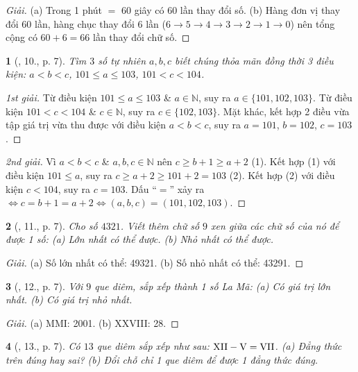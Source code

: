 \documentclass{article}
\newtheorem{baitoan}{}
\begin{document}
\begin{proof}[Giải]
	(a) Trong 1 phút $=$ 60 giây có 60 lần thay đổi số. (b) Hàng đơn vị thay đổi 60 lần, hàng chục thay đổi 6 lần ($6\to5\to4\to3\to2\to1\to0$) nên tổng cộng có $60 + 6 = 66$ lần thay đổi chữ số.
\end{proof}

\begin{baitoan}[\cite{Tuyen_Toan_6}, 10., p. 7]
	Tìm $3$ số tự nhiên $a,b,c$ biết chúng thỏa mãn đồng thời 3 điều kiện: $a < b < c$, $101\le a\le103$, $101 < c < 104$.
\end{baitoan}

\begin{proof}[1st giải]
	Từ điều kiện $101\le a\le103$ \& $a\in\mathbb{N}$, suy ra $a\in\{101,102,103\}$. Từ điều kiện $101 < c < 104$ \& $c\in\mathbb{N}$, suy ra $c\in\{102,103\}$. Mặt khác, kết hợp 2 điều vừa tập giá trị vừa thu được với điều kiện $a < b < c$, suy ra $a = 101$, $b = 102$, $c = 103$.
\end{proof}

\begin{proof}[2nd giải]
	Vì $a < b < c$ \& $a,b,c\in\mathbb{N}$ nên $c\ge b + 1\ge a + 2$ (1). Kết hợp (1) với điều kiện $101\le a$, suy ra $c\ge a + 2\ge101 + 2 = 103$ (2). Kết hợp (2) với điều kiện $c < 104$, suy ra $c = 103$. Dấu ``$=$'' xảy ra $\Leftrightarrow c = b + 1 = a + 2\Leftrightarrow(a,b,c) = (101,102,103)$.
\end{proof}

\begin{baitoan}[\cite{Tuyen_Toan_6}, 11., p. 7]
	Cho số $4321$. Viết thêm chữ số $9$ xen giữa các chữ số của nó để được 1 số: (a) Lớn nhất có thể được. (b) Nhỏ nhất có thể được.
\end{baitoan}

\begin{proof}[Giải]
	(a) Số lớn nhất có thể: 49321. (b) Số nhỏ nhất có thể: 43291.
\end{proof}

\begin{baitoan}[\cite{Tuyen_Toan_6}, 12., p. 7]
	Với $9$ que diêm, sắp xếp thành 1 số La Mã: (a) Có giá trị lớn nhất. (b) Có giá trị nhỏ nhất.
\end{baitoan}

\begin{proof}[Giải]
	(a) MMI: 2001. (b) XXVIII: 28.
\end{proof}

\begin{baitoan}[\cite{Tuyen_Toan_6}, 13., p. 7]
	Có $13$ que diêm sắp xếp như sau: $\rm XII - V = VII$. (a) Đẳng thức trên đúng hay sai? (b) Đổi chỗ chỉ 1 que diêm để được 1 đẳng thức đúng.
\end{baitoan}
\end{document}
